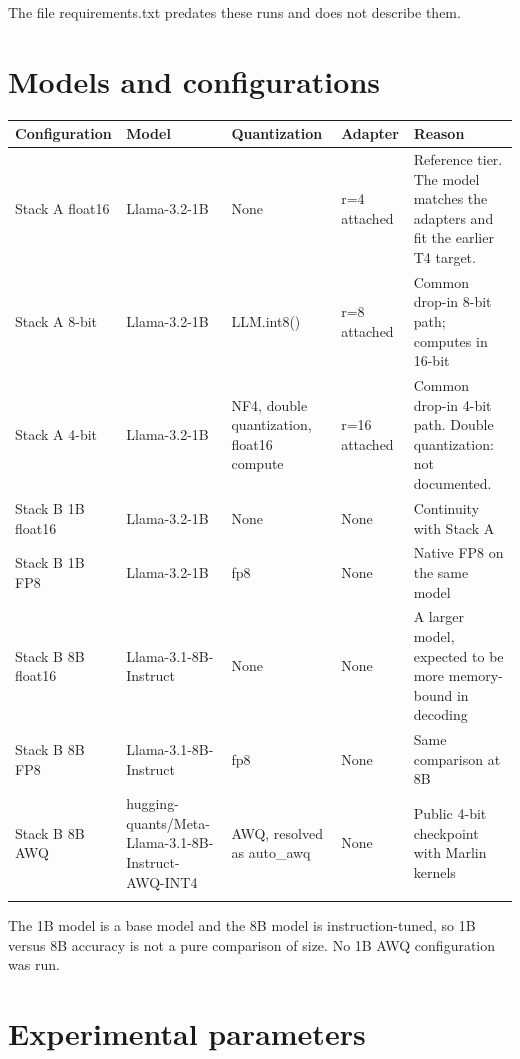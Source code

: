 The file requirements.txt predates these runs and does not describe them.

\section{Models and configurations}

\begingroup\footnotesize\setlength{\tabcolsep}{4pt}
\begin{longtable}{>{\raggedright\arraybackslash}p{27.5mm}>{\raggedright\arraybackslash}p{33.4mm}>{\raggedright\arraybackslash}p{27.1mm}>{\raggedright\arraybackslash}p{17.3mm}>{\raggedright\arraybackslash}p{30.7mm}}
\toprule
\textbf{Configuration} & \textbf{Model} & \textbf{Quantization} & \textbf{Adapter} & \textbf{Reason} \\
\midrule
\endhead
Stack A float16 & Llama-3.2-1B~\cite{b36} & None & r=4 attached & Reference tier. The model matches the adapters and fit the earlier T4 target. \\*
Stack A 8-bit & Llama-3.2-1B & LLM.int8() & r=8 attached & Common drop-in 8-bit path; computes in 16-bit~\cite{b6} \\*
Stack A 4-bit & Llama-3.2-1B & NF4, double quantization, float16 compute & r=16 attached & Common drop-in 4-bit path. Double quantization: not documented. \\*
Stack B 1B float16 & Llama-3.2-1B & None & None & Continuity with Stack A \\*
Stack B 1B FP8 & Llama-3.2-1B & fp8 & None & Native FP8 on the same model \\*
Stack B 8B float16 & Llama-3.1-8B-Instruct~\cite{b36} & None & None & A larger model, expected to be more memory-bound in decoding \\*
Stack B 8B FP8 & Llama-3.1-8B-Instruct & fp8 & None & Same comparison at 8B \\*
Stack B 8B AWQ & hugging-quants/Meta-Llama-3.1-8B-Instruct-AWQ-INT4 & AWQ, resolved as auto\_\allowbreak{}awq & None & Public 4-bit checkpoint with Marlin kernels \\*
\bottomrule\noalign{\nobreak}
\end{longtable}
\addtocounter{table}{-1}
\endgroup

The 1B model is a base model and the 8B model is instruction-tuned, so 1B versus 8B accuracy is not a pure comparison of size. No 1B AWQ configuration was run.

\section{Experimental parameters}


